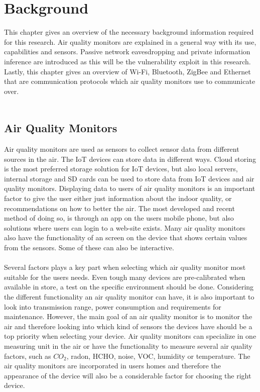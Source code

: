 \chapter*{Background}
This chapter gives an overview of the necessary background information required for this research. Air quality monitors are explained in a general way with its use, capabilities and sensors. Passive network eavesdropping and private information inference are introduced as this will be the vulnerability exploit in this research. Lastly, this chapter gives an overview of Wi-Fi, Bluetooth, ZigBee and Ethernet that are communication protocols which air quality monitors use to communicate over. \\\\
\section*{Air Quality Monitors}
Air quality monitors are used as sensors to collect sensor data from different sources in the air. \cite{GeneralAirQualityMonitor} The IoT devices can store data in different ways. Cloud storing is the most preferred storage solution for IoT devices, but also local servers, internal storage and SD cards can be used to store data from IoT devices and air quality monitors. \cite{AQMBigSource} Displaying data to users of air quality monitors is an important factor to give the user either just information about the indoor quality, or recommendations on how to better the air. \cite{AQMBigSource} The most developed and recent method of doing so, is through an app on the users mobile phone, but also solutions where users can login to a web-site exists. Many air quality monitors also have the functionality of an screen on the device that shows certain values from the sensors. Some of these can also be interactive. \cite{AQMBigSource}
\\\\
Several factors plays a key part when selecting which air quality monitor most suitable for the users needs. Even tough many devices are pre-calibrated when available in store, a test on the specific environment should be done. Considering the different functionality an air quality monitor can have, it is also important to look into transmission range, power consumption and requirements for maintenance. \cite{AQMBigSource} However, the main goal of an air quality monitor is to monitor the air and therefore looking into which kind of sensors the devices have should be a top priority when selecting your device. Air quality monitors can specialize in one measuring unit in the air or have the functionality to measure several air quality factors, such as \(CO_2\), radon, HCHO, noise, VOC, humidity or temperature. The air quality monitors are incorporated in users homes and therefore the appearance of the device will also be a considerable factor for choosing the right device. \cite{IAQMonitorCommunicationReview} 
